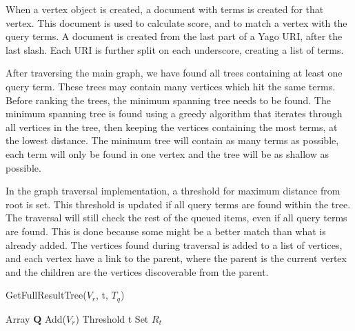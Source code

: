 When a vertex object is created, a document with terms is created for that vertex. This document is used to calculate score, and to match a vertex with the query terms. A document is created from the last part of a Yago URI, after the last slash. Each URI is further split on each underscore, creating a list of terms.

After traversing the main graph, we have found all trees containing at least one query term. These trees may contain many vertices which hit the same terms. Before ranking the trees, the minimum spanning tree needs to be found. The minimum spanning tree is found using a greedy algorithm that iterates through all vertices in the tree, then keeping the vertices containing the most terms, at the lowest distance. The minimum tree will contain as many terms as possible, each term will only be found in one vertex and the tree will be as shallow as possible.

In the graph traversal implementation, a threshold for maximum distance from root is set. This threshold is updated if all query terms are found within the tree. The traversal will still check the rest of the queued items, even if all query terms are found. This is done because some might be a better match than what is already added. The vertices found during traversal is added to a list of vertices, and each vertex have a link to the parent, where the parent is the current vertex and the children are the vertices discoverable from the parent.
\begin{algorithm}[H]
    \caption{GetFullResultTree($V_r$, t, $T_q$)}
    \label{fullRT}
    \SetAlgoLined
    Array $\mathbf{Q}$ Add($V_r$)\; Threshold t\; Set $R_t$\;
\end{algorithm}

